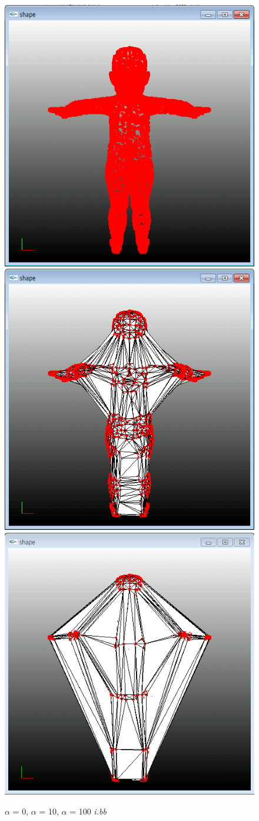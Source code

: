 \documentclass[11pt]{article}
\begin{document}
\begin{figure}[ht]
\includegraphics[width=.5\textwidth]{FIGS/alpha0-ibb}
\hspace{1cm}
\includegraphics[width=.5\textwidth]{FIGS/alpha10-ibb}
\vspace{1cm}
\includegraphics[width=.5\textwidth]{FIGS/alpha100-ibb}
\caption{$\alpha$ = 0, $\alpha$ = 10, $\alpha$ = 100 \textit{i.bb}}
\end{figure}
\end{document}
